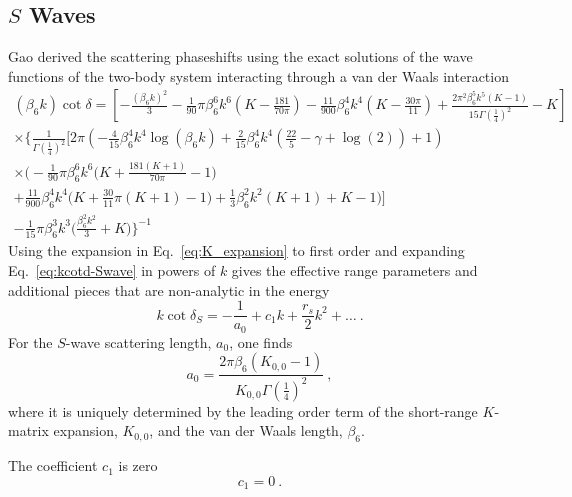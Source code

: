\documentclass[aps,preprint,superscriptaddress]{revtex4-1}
\begin{document}
\subsection{$S$ Waves}
Gao derived the scattering phaseshifts using the exact solutions of
the wave functions of the two-body system interacting through a van
der Waals interaction
\begin{multline}
  \label{eq:kcotd-Swave}
(\beta_6 k) \cot\delta = \left[-\frac{(\beta_6 k)^2}{3}-\frac{1}{90} \pi  \beta_6 ^6 k^6 \left(K-\frac{181}{70 \pi }\right)-\frac{11}{900} \beta_6 ^4 k^4 \left(K-\frac{30 \pi
   }{11}\right)+\frac{2 \pi ^2 \beta_6 ^5 k^5 (K-1)}{15 \Gamma
   \left(\frac{1}{4}\right)^2}-K\right]\\
\times \Biggl\{
 \frac{1}{\Gamma \left(\frac{1}{4}\right)^2}\Biggl[2 \pi  \left(-\frac{4}{15} \beta_6 ^4 k^4 \log (\beta_6 
   k)+\frac{2}{15} \beta_6 ^4 k^4 \left(\frac{22}{5}-\gamma +\log
     (2)\right)+1\right)
 \\
 \times\biggl(-\frac{1}{90} \pi  \beta_6 ^6 k^6 \bigl(K+\frac{181 (K+1)}{70 \pi
     }-1\bigr)\\
   +\frac{11}{900} \beta_6 ^4 k^4 \bigl(K+\frac{30}{11} \pi
   (K+1)-1\bigr)+\frac{1}{3} \beta_6 ^2 k^2
 (K+1)+K-1\biggr)\Biggr]
\\
-\frac{1}{15} \pi  \beta_6 ^3 k^3 \bigl(\frac{\beta_6 ^2 k^2}{3}+K\bigr)\Biggr\}^{-1}
\end{multline}
Using the expansion in Eq.~\eqref{eq:K_expansion} to first order and
expanding Eq.~\eqref{eq:kcotd-Swave} in powers of $k$ gives the
effective range parameters and additional pieces that are non-analytic
in the energy
\begin{equation}
  \label{eq:Swave-kcotd-exp}
  k\cot \delta_S = -\frac{1}{a_0} + c_1 k + \frac{r_s}{2} k^2 +\ldots~.
\end{equation}
For the $S$-wave scattering length,
$a_0$, one finds~\cite{PhysRevA.58.4222}
\begin{equation}
\label{eq:K00}
  a_0  =\frac{2 \pi  \beta_6  (K_{0,0}-1)}{K_{0,0} \Gamma \left(\frac{1}{4}\right)^2}~,
\end{equation}
where it is uniquely determined by the leading order term of the short-range
$K$-matrix expansion, $K_{0,0}$, and the van der Waals length, $\beta_6$.

The coefficient $c_1$ is zero
\begin{equation}
  \label{eq:nonanalytic}
  c_1 = 0~.
\end{equation}
\end{document}
